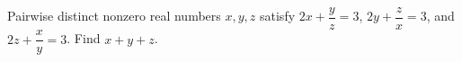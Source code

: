 Pairwise distinct nonzero real numbers $x,y,z$ satisfy $2x+\dfrac{y}{z}=3$, $2y+\dfrac{z}{x}=3$, and $2z+\dfrac{x}{y}=3$. Find $x+y+z$.
